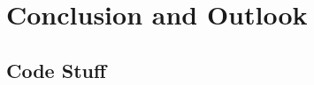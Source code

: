 \documentclass[11pt]{article}
\begin{document}
\section{Conclusion and Outlook} \label{sec:conc}











































\begin{appendices}
    \section{Code Stuff} \label{appendix_code}
\end{appendices}
\newpage

 
 
\end{document}
